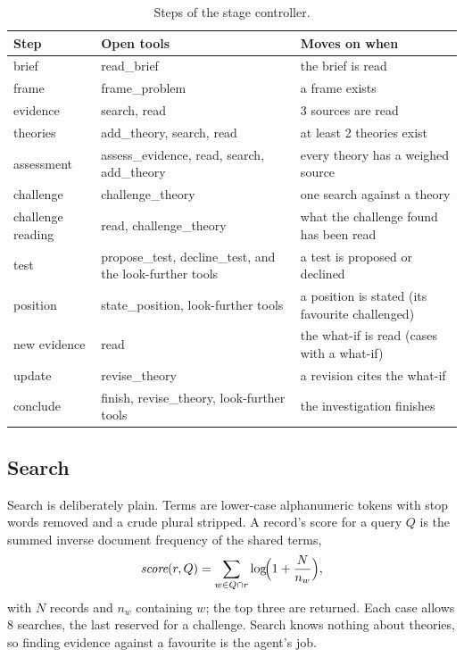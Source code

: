 \begin{table}[H]\centering\small
\caption{Steps of the stage controller.}\label{tab:stages}
\begin{tabularx}{\linewidth}{@{}l X X@{}}
\toprule
Step & Open tools & Moves on when\\
\midrule
brief & read\_brief & the brief is read\\
frame & frame\_problem & a frame exists\\
evidence & search, read & 3 sources are read\\
theories & add\_theory, search, read & at least 2 theories exist\\
assessment & assess\_evidence, read, search, add\_theory & every theory has a weighed source\\
challenge & challenge\_theory & one search against a theory\\
challenge reading & read, challenge\_theory & what the challenge found has been read\\
test & propose\_test, decline\_test, and the look-further tools & a test is proposed or declined\\
position & state\_position, look-further tools & a position is stated (its favourite challenged)\\
new evidence & read & the what-if is read (cases with a what-if)\\
update & revise\_theory & a revision cites the what-if\\
conclude & finish, revise\_theory, look-further tools & the investigation finishes\\
\bottomrule
\end{tabularx}
\end{table}

\subsection{Search}
Search is deliberately plain. Terms are lower-case alphanumeric tokens with stop words removed and a crude plural
stripped. A record's score for a query $Q$ is the summed inverse document frequency of the shared terms,
\begin{equation}
  \textit{score}(r, Q) = \sum_{w \in Q \cap r} \log\!\Bigl(1 + \frac{N}{n_w}\Bigr),
\end{equation}
with $N$ records and $n_w$ containing $w$; the top three are returned. Each case allows 8 searches, the last reserved
for a challenge. Search knows nothing about theories, so finding evidence against a favourite is the agent's job.

